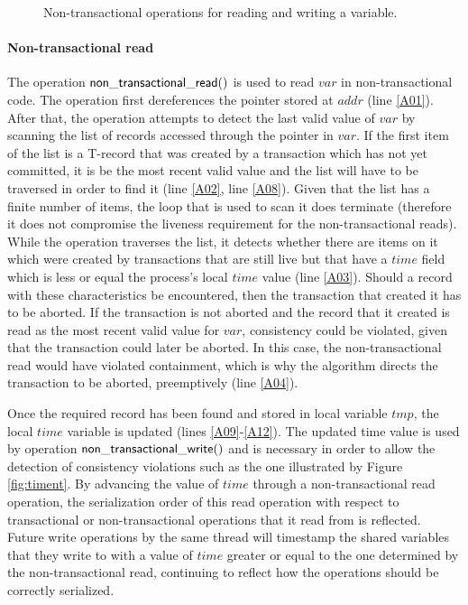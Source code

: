 \documentclass[11pt,letterpaper]{article}
\begin{document}
\begin{figure}[htb]
{{\begin{minipage}[t]{150mm}
\begin{tabbing}
\end{tabbing}
\normalsize
\end{minipage}
}
\caption{Non-transactional operations for reading and writing a variable.}
\label{fig:ntops}
}
\end{figure}

\paragraph{Non-transactional read}
The   operation  ${\sf   non\_transactional\_read()}$  is   used   to  read
$\mathit{va}r$ in non-transactional code.  
The  operation first  dereferences  the pointer  stored at  $\mathit{addr}$
(line \ref{A01}). After that, the  
operation  attempts to  detect the  last valid  value of  $\mathit{var}$ by
scanning the list of records accessed  
through the pointer in $\mathit{var}$. 
If the first item of the list is a T-record that was created by a 
transaction which  has not yet  committed, it is be the  most recent
valid value and the list  
will  have to  be  traversed in  order  to find  it  (line \ref{A02},  line
\ref{A08}). Given that the list has  
a finite number of  items, the loop that is used to  scan it does terminate
(therefore it does not  
compromise the liveness requirement for the non-transactional reads). While
the operation  
traverses the  list, it detects  whether there are  items on it  which were
created by transactions that  
are still live  but that have a  $\mathit{time}$ field which is  less or equal
the process{}'s local $\mathit{time}$  
value  (line \ref{A03}).  Should  a record  with  these characteristics  be
encountered, then the transaction  
that created it has to be aborted. 
If the transaction is not aborted and the record that it created is read as 
the  most  recent valid  value  for  $\mathit{var}$,  consistency could  be
violated, given that the transaction  
could later be aborted. In this case, the non-transactional read would have
violated containment,  
which  is  why  the  algorithm  directs  the  transaction  to  be  aborted,
preemptively (line \ref{A04}).      

Once  the required  record  has been  found  and stored  in local  variable 
$\mathit{tmp}$, the local $\mathit{time}$   
variable  is updated  (lines \ref{A09}-\ref{A12}).  The updated  {\sf time}
value is used by operation  
${\sf non\_transactional\_write()}$ and is necessary in order to allow 
the detection of consistency 
violations such as the one illustrated by Figure \ref{fig:timent}. 
By advancing the value of $\mathit{time}$ 
through a non-transactional read operation, 
the serialization order of this read operation with 
respect to transactional or non-transactional operations 
that it read from is reflected. Future write 
operations by the same thread will timestamp the shared variables 
that they write to with a value  of $\mathit{time}$ greater or equal to the one 
determined by the non-transactional read, continuing to 
reflect how the operations should be correctly serialized. 
\end{document}
